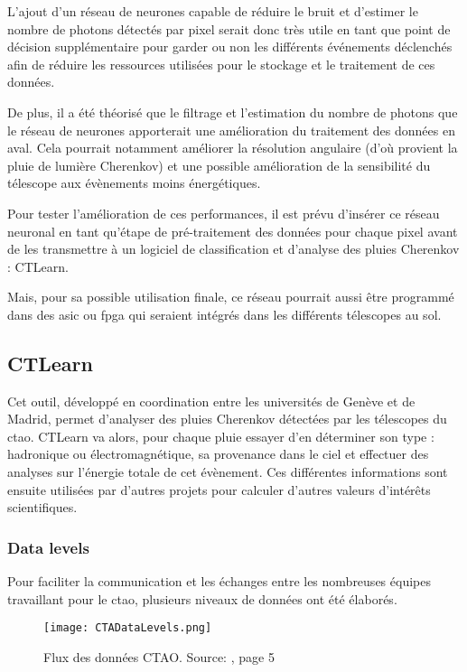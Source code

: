 L'ajout d'un réseau de neurones capable de réduire le bruit et d'estimer le nombre de photons détectés par pixel serait donc très utile en tant que 
point de décision supplémentaire pour garder ou non les différents événements déclenchés afin de réduire les ressources utilisées pour le stockage 
et le traitement de ces données.

De plus, il a été théorisé que le filtrage et l'estimation du nombre de photons que le réseau de neurones apporterait une amélioration du 
traitement des données en aval. Cela pourrait notamment améliorer la résolution angulaire (d'où provient la pluie de lumière Cherenkov) et une possible amélioration de
la sensibilité du télescope aux évènements moins énergétiques.

Pour tester l'amélioration de ces performances, il est prévu d'insérer ce réseau neuronal en tant qu'étape de pré-traitement des données
pour chaque pixel avant de les transmettre à un logiciel de classification et d'analyse des pluies Cherenkov : CTLearn.

Mais, pour sa possible utilisation finale, ce réseau pourrait aussi être programmé dans des \gls{asic} ou \gls{fpga} qui seraient intégrés dans les différents télescopes au sol.

\subsection{CTLearn}
Cet outil, développé en coordination entre les universités de Genève et de Madrid, permet d'analyser des pluies Cherenkov détectées 
par les télescopes du \gls{ctao}. CTLearn va alors, pour chaque pluie essayer d'en déterminer son type : hadronique ou électromagnétique, 
sa provenance dans le ciel et effectuer des analyses sur l'énergie totale de cet évènement.
Ces différentes informations sont ensuite utilisées par d'autres projets pour calculer d'autres valeurs d'intérêts scientifiques.

\subsubsection{Data levels}
Pour faciliter la communication et les échanges entre les nombreuses équipes travaillant pour le \gls{ctao}, 
plusieurs niveaux de données ont été élaborés.

\begin{figure}[tbph!]
	\centering
	\texttt{[image: CTADataLevels.png]}
	\caption[Flux des données CTAO]{Flux des données CTAO. Source: \cite{CTAOComputingChallenges}, page 5}
\end{figure}

